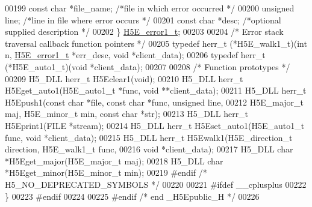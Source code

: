 \begin{DoxyCode}
00199     \textcolor{keyword}{const} \textcolor{keywordtype}{char}  *file\_name;             \textcolor{comment}{/*file in which error occurred       */}
00200     \textcolor{keywordtype}{unsigned}    line;                   \textcolor{comment}{/*line in file where error occurs    */}
00201     \textcolor{keyword}{const} \textcolor{keywordtype}{char}  *desc;                  \textcolor{comment}{/*optional supplied description      */}
00202 \} \hyperlink{struct_h5_e__error1__t}{H5E\_error1\_t};
00203 
00204 \textcolor{comment}{/* Error stack traversal callback function pointers */}
00205 \textcolor{keyword}{typedef} herr\_t (*H5E\_walk1\_t)(\textcolor{keywordtype}{int} n, \hyperlink{struct_h5_e__error1__t}{H5E\_error1\_t} *err\_desc, \textcolor{keywordtype}{void} *client\_data);
00206 \textcolor{keyword}{typedef} herr\_t (*H5E\_auto1\_t)(\textcolor{keywordtype}{void} *client\_data);
00207 
00208 \textcolor{comment}{/* Function prototypes */}
00209 H5\_DLL herr\_t H5Eclear1(\textcolor{keywordtype}{void});
00210 H5\_DLL herr\_t H5Eget\_auto1(H5E\_auto1\_t *func, \textcolor{keywordtype}{void} **client\_data);
00211 H5\_DLL herr\_t H5Epush1(\textcolor{keyword}{const} \textcolor{keywordtype}{char} *file, \textcolor{keyword}{const} \textcolor{keywordtype}{char} *func, \textcolor{keywordtype}{unsigned} line,
00212     H5E\_major\_t maj, H5E\_minor\_t min, \textcolor{keyword}{const} \textcolor{keywordtype}{char} *str);
00213 H5\_DLL herr\_t H5Eprint1(FILE *stream);
00214 H5\_DLL herr\_t H5Eset\_auto1(H5E\_auto1\_t func, \textcolor{keywordtype}{void} *client\_data);
00215 H5\_DLL herr\_t H5Ewalk1(H5E\_direction\_t direction, H5E\_walk1\_t func,
00216     \textcolor{keywordtype}{void} *client\_data);
00217 H5\_DLL \textcolor{keywordtype}{char} *H5Eget\_major(H5E\_major\_t maj);
00218 H5\_DLL \textcolor{keywordtype}{char} *H5Eget\_minor(H5E\_minor\_t min);
00219 \textcolor{preprocessor}{#endif }\textcolor{comment}{/* H5\_NO\_DEPRECATED\_SYMBOLS */}\textcolor{preprocessor}{}
00220 
00221 \textcolor{preprocessor}{#ifdef \_\_cplusplus}
00222 \}
00223 \textcolor{preprocessor}{#endif}
00224 
00225 \textcolor{preprocessor}{#endif }\textcolor{comment}{/* end \_H5Epublic\_H */}\textcolor{preprocessor}{}
00226 
\end{DoxyCode}
